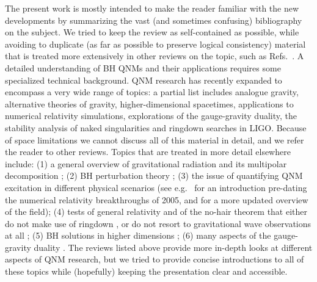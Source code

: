 \documentclass[]{iopart}
\begin{document}
The present work is mostly intended to make the reader familiar with the new
developments by summarizing the vast (and sometimes confusing) bibliography on
the subject.  We tried to keep the review as self-contained as possible, while
avoiding to duplicate (as far as possible to preserve logical consistency)
material that is treated more extensively in other reviews on the topic, such
as
Refs.~\cite{Kokkotas:1999bd,Nollert:1999ji,RevModPhys.70.1545,Ferrari:2007dd}.
A detailed understanding of BH QNMs and their applications requires some
specialized technical background. QNM research has recently expanded to
encompass a very wide range of topics: a partial list includes analogue
gravity, alternative theories of gravity, higher-dimensional spacetimes,
applications to numerical relativity simulations, explorations of the
gauge-gravity duality, the stability analysis of naked singularities and
ringdown searches in LIGO. Because of space limitations we cannot discuss all
of this material in detail, and we refer the reader to other reviews. Topics
that are treated in more detail elsewhere include: (1) a general overview of
gravitational radiation \cite{Cutler:2002me,Sathyaprakash:2009xs} and its
multipolar decomposition \cite{Thorne:1980ru}; (2) BH perturbation theory
\cite{MTB,Nakamura:1987zz,Mino:1997bx,Frolov:1998wf,Sasaki:2003xr,Nagar:2005ea};
(3) the issue of quantifying QNM excitation in different physical scenarios
(see e.g.~\cite{Berti:2006hb} for an introduction pre-dating the numerical
relativity breakthroughs of 2005, and \cite{BertiCampanelli} for a more
updated overview of the field); (4) tests of general relativity and of the
no-hair theorem that either do not make use of ringdown
\cite{AmaroSeoane:2007aw}, or do not resort to gravitational wave observations
at all \cite{Barcelo:2005fc,Psaltis:2008bb,Will:2005va}; (5) BH solutions in
higher dimensions \cite{Emparan:2008eg}; (6) many aspects of the gauge-gravity
duality
\cite{Son:2007vk,Aharony:1999ti,Gubser:2009md,Hartnoll:2009sz,Herzog:2009xv}.
The reviews listed above provide more in-depth looks at different aspects of
QNM research, but we tried to provide concise introductions to all of these
topics while (hopefully) keeping the presentation clear and accessible.

\end{document}
